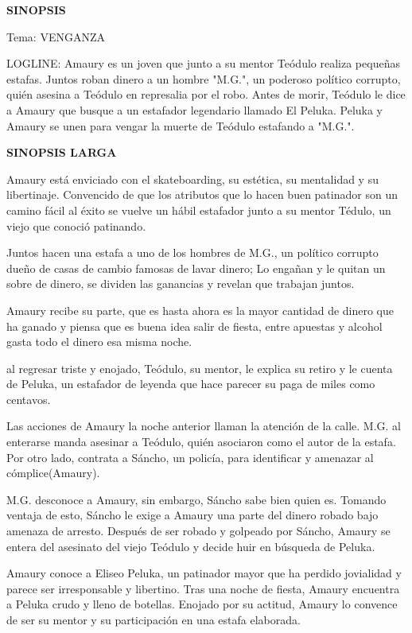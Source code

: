 
\setcounter{page}{1}

\setlength{\parskip}{\baselineskip} 

\textbf{SINOPSIS}

Tema: VENGANZA

LOGLINE: 
Amaury es un joven que junto a su mentor Teódulo realiza pequeñas estafas.
Juntos roban dinero a un hombre "M.G.", un poderoso político corrupto, quién asesina a Teódulo en represalia por el robo. Antes de morir, Teódulo le dice a Amaury que busque a un estafador legendario llamado El Peluka. Peluka y Amaury se unen para vengar la muerte de Teódulo estafando a "M.G.".

\textbf{SINOPSIS LARGA}

Amaury está enviciado con el skateboarding, su estética, su mentalidad y su libertinaje. Convencido de que los atributos que lo hacen buen patinador son un camino fácil al éxito se vuelve un hábil estafador junto a su mentor Tédulo, un viejo que conoció patinando. 

Juntos hacen una estafa a uno de los hombres de M.G., un político corrupto dueño de casas de cambio famosas de lavar dinero; Lo engañan y le quitan un sobre de dinero, se dividen las ganancias y revelan que trabajan juntos.

Amaury recibe su parte, que es hasta ahora es la mayor cantidad de dinero que ha ganado y piensa que es buena idea salir de fiesta, entre apuestas y alcohol gasta todo el dinero esa misma noche. 


al regresar triste y enojado, Teódulo, su mentor, le explica su retiro y le cuenta de Peluka, un estafador de leyenda que hace parecer su paga de miles como centavos. 

Las acciones de Amaury la noche anterior llaman la atención de la calle. M.G. al enterarse manda asesinar a Teódulo, quién asociaron como el autor de la estafa. Por otro lado, contrata a Sáncho, un policía, para identificar  y amenazar al cómplice(Amaury). 

M.G. desconoce a Amaury, sin embargo, Sáncho sabe bien quien es. Tomando ventaja de esto, Sáncho le exige a Amaury una parte del dinero robado bajo amenaza de arresto. Después de ser robado y golpeado por Sáncho, Amaury se entera del asesinato del viejo Teódulo y decide huir en búsqueda de Peluka.

Amaury conoce a Eliseo Peluka, un patinador mayor que ha perdido jovialidad y parece ser irresponsable y libertino. Tras una noche de fiesta, Amaury encuentra a Peluka crudo y lleno de botellas. Enojado por su actitud, Amaury lo convence de ser su mentor y su participación en una estafa elaborada. 

